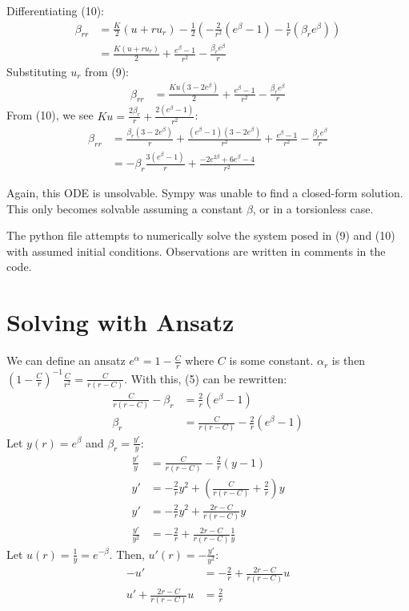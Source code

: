 \documentclass[12pt]{article}
\begin{document}
Differentiating (10):
\begin{align*}
  \beta_{rr} &= \frac{K}{2}(u+ru_r)-\frac{1}{2}(-\frac{2}{r^2}(e^\beta -1)-\frac{1}{r}(\beta_r e^\beta)) \\
  &= \frac{K(u+ru_r)}{2} + \frac{e^\beta - 1}{r^2} - \frac{\beta_r e^\beta}{r}
\end{align*}
Substituting $u_r$ from (9):
\begin{align*}
  \beta_{rr} &= \frac{Ku(3-2e^\beta)}{2} + \frac{e^\beta - 1}{r^2} - \frac{\beta_r e^\beta}{r}
\end{align*}
From (10), we see $Ku = \frac{2\beta_r}{r} + \frac{2(e^\beta - 1)}{r^2}$:
\begin{align}
  \beta_{rr} &= \frac{\beta_r(3-2e^\beta)}{r} + \frac{(e^\beta-1)(3-2e^\beta)}{r^2} + \frac{e^\beta - 1}{r^2} - \frac{\beta_r e^\beta}{r} \nonumber \\
  &= -\beta_r\frac{3(e^\beta - 1)}{r} + \frac{-2e^{2\beta}+6e^\beta-4}{r^2}
\end{align}

Again, this ODE is unsolvable. Sympy was unable to find a closed-form solution. This only becomes solvable assuming a constant $\beta$, or in a torsionless case.

The python file attempts to numerically solve the system posed in (9) and (10) with assumed initial conditions. Observations are written in comments in the code.

\section*{Solving with Ansatz}

We can define an ansatz $e^\alpha = 1 - \frac{C}{r}$ where $C$ is some constant. $\alpha_r$ is then $\left(1-\frac{C}{r}\right)^{-1}\frac{C}{r^2} = \frac{C}{r(r-C)}$. With this, (5) can be rewritten:
\begin{align*}
  \frac{C}{r(r-C)} - \beta_r &= \frac{2}{r}(e^\beta - 1) \\
  \beta_r &= \frac{C}{r(r-C)} - \frac{2}{r}(e^\beta - 1)
\end{align*}
Let $y(r) = e^\beta$ and $\beta_r = \frac{y'}{y}$:
\begin{align*}
  \frac{y'}{y} &= \frac{C}{r(r-C)} - \frac{2}{r}(y - 1) \\
  y' &= -\frac{2}{r}y^2 + \left(\frac{C}{r(r-C)} + \frac{2}{r}\right)y \\
  y' &= -\frac{2}{r}y^2 + \frac{2r-C}{r(r-C)}y \\
  \frac{y'}{y^2} &= -\frac{2}{r} + \frac{2r-C}{r(r-C)}\frac{1}{y}
\end{align*}
Let $u(r) = \frac{1}{y} = e^{-\beta}$. Then, $u'(r) = -\frac{y'}{y^2}$:
\begin{align*}
  -u' &= -\frac{2}{r} + \frac{2r-C}{r(r-C)}u \\
  u' + \frac{2r-C}{r(r-C)}u &= \frac{2}{r}
\end{align*}
\end{document}
